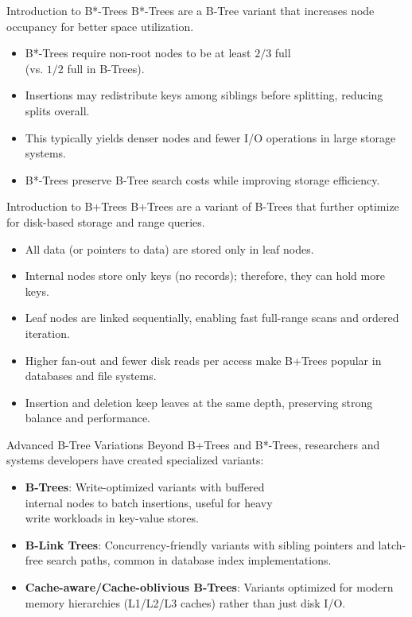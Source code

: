 \documentclass[14pt,aspectratio=1610]{beamer}
\begin{document}
\begin{frame}{Introduction to B*-Trees}
  B*-Trees are a B-Tree variant that increases node\\ occupancy for better space utilization.

  \pause{}
  \begin{itemize}[<+->]
    \item B*-Trees require non-root nodes to be at least \(2/3\) full\\ (vs. \(1/2\) full in B-Trees).
    \item Insertions may redistribute keys among siblings before splitting, reducing splits overall.
    \item This typically yields denser nodes and fewer I/O operations in large storage systems.
    \item B*-Trees preserve B-Tree search costs while improving storage efficiency.
  \end{itemize}
\end{frame}

\begin{frame}{Introduction to B+Trees}
  B+Trees are a variant of B-Trees that further optimize for disk-based storage and range queries.

  \pause{}
  \begin{itemize}[<+->]
    \item All data (or pointers to data) are stored only in leaf nodes.
    \item Internal nodes store only keys (no records); therefore, they can hold more keys.
    \item Leaf nodes are linked sequentially, enabling fast full-range scans and ordered iteration.
    \item Higher fan-out and fewer disk reads per access make B+Trees popular in databases and file systems.
    \item Insertion and deletion keep leaves at the same depth, preserving strong balance and performance.
  \end{itemize}
\end{frame}

\begin{frame}{Advanced B-Tree Variations}
  Beyond B+Trees and B*-Trees, researchers and systems developers have created specialized variants:

  \pause{}
  \begin{itemize}[<+->]
    \item \textbf{B\textepsilon{}-Trees}: Write-optimized variants with buffered\\ internal nodes to batch insertions, useful for heavy\\ write workloads in key-value stores.
    \item \textbf{B-Link Trees}: Concurrency-friendly variants with sibling pointers and latch-free search paths, common in database index implementations.
    \item \textbf{Cache-aware/Cache-oblivious B-Trees}: Variants optimized for modern memory hierarchies (L1/L2/L3 caches) rather than just disk I/O.
  \end{itemize}
\end{frame}
\end{document}
